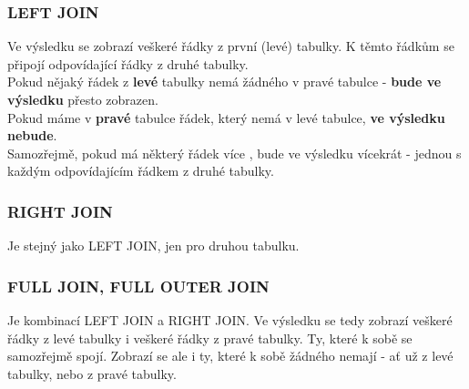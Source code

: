 \subsubsection{LEFT JOIN}
Ve výsledku se zobrazí veškeré řádky z první (levé) tabulky. K těmto řádkům se připojí odpovídající řádky z druhé tabulky.\\
Pokud nějaký řádek z \textbf{levé} tabulky nemá žádného  v pravé tabulce - \textbf{bude ve výsledku} přesto zobrazen.\\
Pokud máme v \textbf{pravé} tabulce řádek, který nemá  v levé tabulce, \textbf{ve výsledku nebude}.\\
Samozřejmě, pokud má některý řádek více , bude ve výsledku vícekrát - jednou s každým odpovídajícím řádkem z druhé tabulky.

\subsubsection{RIGHT JOIN}
Je stejný jako LEFT JOIN, jen pro druhou tabulku.

\subsubsection{FULL JOIN, FULL OUTER JOIN}
Je kombinací LEFT JOIN a RIGHT JOIN. Ve výsledku se tedy zobrazí veškeré řádky z levé tabulky i veškeré řádky z pravé tabulky. Ty, které k sobě  se samozřejmě spojí. Zobrazí se ale i ty, které k sobě žádného  nemají - ať už z levé tabulky, nebo z pravé tabulky. 
